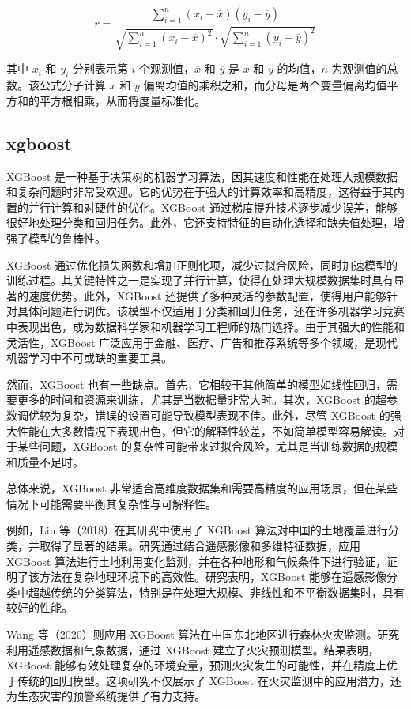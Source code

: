 \documentclass[AutoFakeBold]{LZUThesis-PgD&PhD}
\begin{document}
	\[
	r = \frac{\sum_{i=1}^{n} (x_i - \overline{x})(y_i - \overline{y})}{\sqrt{\sum_{i=1}^{n} (x_i - \overline{x})^2} \cdot \sqrt{\sum_{i=1}^{n} (y_i - \overline{y})^2}}
	\]
	
	其中 \( x_i \) 和 \( y_i \) 分别表示第 \( i \) 个观测值，\( \overline{x} \) 和 \( \overline{y} \) 是 \( x \) 和 \( y \) 的均值，\( n \) 为观测值的总数。该公式分子计算 \( x \) 和 \( y \) 偏离均值的乘积之和，而分母是两个变量偏离均值平方和的平方根相乘，从而将度量标准化。
	
	
	
	\subsection{xgboost}
	XGBoost 是一种基于决策树的机器学习算法，因其速度和性能在处理大规模数据和复杂问题时非常受欢迎。它的优势在于强大的计算效率和高精度，这得益于其内置的并行计算和对硬件的优化。XGBoost 通过梯度提升技术逐步减少误差，能够很好地处理分类和回归任务。此外，它还支持特征的自动化选择和缺失值处理，增强了模型的鲁棒性。
	
	XGBoost 通过优化损失函数和增加正则化项，减少过拟合风险，同时加速模型的训练过程。其关键特性之一是实现了并行计算，使得在处理大规模数据集时具有显著的速度优势。此外，XGBoost 还提供了多种灵活的参数配置，使得用户能够针对具体问题进行调优。该模型不仅适用于分类和回归任务，还在许多机器学习竞赛中表现出色，成为数据科学家和机器学习工程师的热门选择。由于其强大的性能和灵活性，XGBoost 广泛应用于金融、医疗、广告和推荐系统等多个领域，是现代机器学习中不可或缺的重要工具。
	
	然而，XGBoost 也有一些缺点。首先，它相较于其他简单的模型如线性回归，需要更多的时间和资源来训练，尤其是当数据量非常大时。其次，XGBoost 的超参数调优较为复杂，错误的设置可能导致模型表现不佳。此外，尽管 XGBoost 的强大性能在大多数情况下表现出色，但它的解释性较差，不如简单模型容易解读。对于某些问题，XGBoost 的复杂性可能带来过拟合风险，尤其是当训练数据的规模和质量不足时。
	
	总体来说，XGBoost 非常适合高维度数据集和需要高精度的应用场景，但在某些情况下可能需要平衡其复杂性与可解释性。
	
	例如，Liu 等（2018）在其研究中使用了 XGBoost 算法对中国的土地覆盖进行分类，并取得了显著的结果\cite{liu2018}。研究通过结合遥感影像和多维特征数据，应用 XGBoost 算法进行土地利用变化监测，并在各种地形和气候条件下进行验证，证明了该方法在复杂地理环境下的高效性。研究表明，XGBoost 能够在遥感影像分类中超越传统的分类算法，特别是在处理大规模、非线性和不平衡数据集时，具有较好的性能。
	
	Wang 等（2020）则应用 XGBoost 算法在中国东北地区进行森林火灾监测\cite{wang2020Y}。研究利用遥感数据和气象数据，通过 XGBoost 建立了火灾预测模型。结果表明，XGBoost 能够有效处理复杂的环境变量，预测火灾发生的可能性，并在精度上优于传统的回归模型。这项研究不仅展示了 XGBoost 在火灾监测中的应用潜力，还为生态灾害的预警系统提供了有力支持。
	
\end{document}
